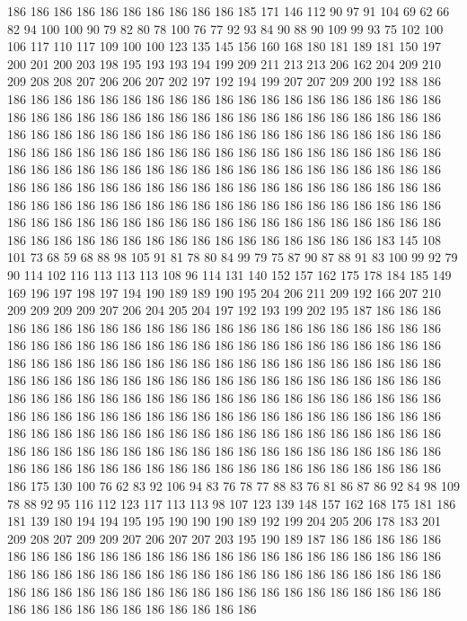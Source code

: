 186 186 186 186 186 186 186 186 186 186 185 171 146 112 90 97 91 104 69 62
66 82 94 100 100 90 79 82 80 78 100 76 77 92 93 84 90 88 90 109
99 93 75 102 100 106 117 110 117 109 100 100 123 135 145 156 160 168 180 181
189 181 150 197 200 201 200 203 198 195 193 193 194 199 209 211 213 213 206 162
204 209 210 209 208 208 207 206 206 207 202 197 192 194 199 207 207 209 200 192
188 186 186 186 186 186 186 186 186 186 186 186 186 186 186 186 186 186 186 186
186 186 186 186 186 186 186 186 186 186 186 186 186 186 186 186 186 186 186 186
186 186 186 186 186 186 186 186 186 186 186 186 186 186 186 186 186 186 186 186
186 186 186 186 186 186 186 186 186 186 186 186 186 186 186 186 186 186 186 186
186 186 186 186 186 186 186 186 186 186 186 186 186 186 186 186 186 186 186 186
186 186 186 186 186 186 186 186 186 186 186 186 186 186 186 186 186 186 186 186
186 186 186 186 186 186 186 186 186 186 186 186 186 186 186 186 186 186 186 186
186 186 186 186 186 186 186 186 186 186 186 186 186 186 186 186 186 186 186 186
186 186 186 186 186 186 186 186 186 186 183 145 108 101 73 68 59 68 88 98
105 91 81 78 80 84 99 79 75 87 90 87 88 91 83 100 99 92 79 90
114 102 116 113 113 113 108 96 114 131 140 152 157 162 175 178 184 185 149 169
196 197 198 197 194 190 189 189 190 195 204 206 211 209 192 166 207 210 209 209
209 209 207 206 204 205 204 197 192 193 199 202 195 187 186 186 186 186 186 186
186 186 186 186 186 186 186 186 186 186 186 186 186 186 186 186 186 186 186 186
186 186 186 186 186 186 186 186 186 186 186 186 186 186 186 186 186 186 186 186
186 186 186 186 186 186 186 186 186 186 186 186 186 186 186 186 186 186 186 186
186 186 186 186 186 186 186 186 186 186 186 186 186 186 186 186 186 186 186 186
186 186 186 186 186 186 186 186 186 186 186 186 186 186 186 186 186 186 186 186
186 186 186 186 186 186 186 186 186 186 186 186 186 186 186 186 186 186 186 186
186 186 186 186 186 186 186 186 186 186 186 186 186 186 186 186 186 186 186 186
186 186 186 186 186 186 186 186 186 186 186 186 186 186 186 186 186 186 186 186
186 186 186 186 186 186 186 186 186 175 130 100 76 62 83 92 106 94 83 76
78 77 88 83 76 81 86 87 86 92 84 98 109 78 88 92 95 116 112 123
117 113 113 98 107 123 139 148 157 162 168 175 181 186 181 139 180 194 194 195
195 190 190 190 189 192 199 204 205 206 178 183 201 209 208 207 209 209 207 206
207 207 203 195 190 189 187 186 186 186 186 186 186 186 186 186 186 186 186 186
186 186 186 186 186 186 186 186 186 186 186 186 186 186 186 186 186 186 186 186
186 186 186 186 186 186 186 186 186 186 186 186 186 186 186 186 186 186 186 186
186 186 186 186 186 186 186 186 186 186 186 186 186 186 186 186 186 186 186 186
